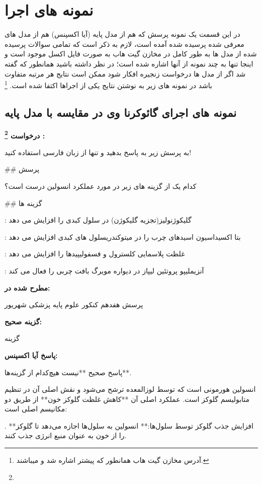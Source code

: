 
\chapter{نمونه های اجرا}
در این قسمت یک نمونه پرسش که هم از مدل پایه (آیا اکسپنس) هم از مدل های معرفی شده پرسیده شده آمده است، لازم به ذکر است که تمامی سوالات پرسیده شده از مدل ها به طور کامل در مخازن گیت هاب به صورت فایل اکسل موجود است و اینجا تنها به چند نمونه از آنها اشاره شده است؛ در نظر داشته باشید همانطور که گفته شد اگر از مدل ها درخواست زنجیره افکار شود ممکن است نتایج هر مرتبه متفاوت باشد در نمونه های زیر به نوشتن نتایج یکی از اجراها اکتفا شده است.
\footnote{
آدرس مخازن گیت هاب همانطور که پیشتر اشاره شد
و
میباشند.
}
\section{
نمونه های اجرای گائوکرنا وی در مقایسه با مدل پایه
}
\textbf{
درخواست
\footnote{}
:
}

به پرسش زیر به پاسخ بدهید و تنها از زبان فارسی استفاده کنید!

\#\# پرسش

کدام یک از گزینه های زیر در مورد عملکرد انسولین درست است؟ 

\#\# گزینه ها

\lr{[A] }
:
گليکوژنوليز(تجزیه گليکوژن) در سلول کبدی را افزایش می دهد

\lr{[B] }
:
بتا اکسيداسيون اسيدهای چرب را در ميتوکندریسلول های کبدی افزایش می دهد

\lr{[C] }
:
غلظت پلاسمایی کلسترول و فسفوليپيدها را افزایش می دهد

\lr{[D] }
:
آنزیمليپو پروتئين ليپاز در دیواره مویرگ بافت چربی را فعال می کند

\textbf{
مطرح شده در:
}

پرسش هفدهم کنکور علوم پایه پزشکی شهریور

\textbf{
گزینه صحیح:
}

گزینه
\lr{[D]}

\textbf{
پاسخ آیا اکسپنس:
}

پاسخ صحیح **نیست هیچ‌کدام از گزینه‌ها**.

انسولین هورمونی است که توسط لوزالمعده ترشح می‌شود و نقش اصلی آن در تنظیم متابولیسم گلوکز است. عملکرد اصلی آن **کاهش غلظت گلوکز خون** از طریق دو مکانیسم اصلی است:

.
**افزایش جذب گلوکز توسط سلول‌ها:** انسولین به سلول‌ها اجازه می‌دهد تا گلوکز را از خون به عنوان منبع انرژی جذب کنند.

